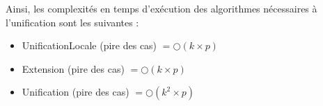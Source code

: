 Ainsi, les complexités en temps d'exécution des algorithmes nécessaires à l'unification 
sont les suivantes :
\begin{itemize}
	\item UnificationLocale (pire des cas) $= \bigcirc(k \times p)$
	\item Extension (pire des cas) $= \bigcirc(k \times p)$
	\item Unification (pire des cas) $= \bigcirc(k^{2} \times p)$
\end{itemize}










